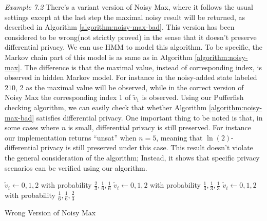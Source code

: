 \noindent
\textit{Example 7.2} There's a variant version of Noisy Max, where it follows the usual settings
except at the last step the maximal
noisy result will be returned, as described in Algorithm \ref{algorithm:noisy-max-bad}.
This version has been considered to be wrong(not strictly proved) in the sense that it doesn't preserve differential privacy.
We can use HMM to model this algorithm.
To be specific, the Markov chain part of this model is as same as in Algorithm \ref{algorithm:noisy-max}.
The difference is that the maximal value, instead of corresponding index, is observed in hidden Markov
model. For instance in the noisy-added state labeled $210$,
$2$ as the maximal value will be observed, while in the correct version of Noisy Max the corresponding index $1$ of $\tilde{v}_1$ is observed.
Using our Pufferfish checking algorithm, we can easily check that whether
Algorithm \ref{algorithm:noisy-max-bad} satisfies differential privacy.
One important thing to be noted is that, in some cases where $n$ is small,
differential privacy is still preserved.
For instance our implementation returns ``unsat'' when $n=5$, meaning that
$\ln(2)$-differential privacy is still preserved under this case.
This result doesn't violate the general consideration of the algorithm;
Instead, it shows that specific privacy scenarios can be verified using our algorithm.

\begin{algorithm}
  \begin{algorithmic}[1]
                {$\tilde{v}_i \leftarrow 0, 1, 2$ with probability
                 $\frac{2}{3}, \frac{1}{6}, \frac{1}{6}$}
                {$\tilde{v}_i \leftarrow 0, 1, 2$ with probability
                 $\frac{1}{3}, \frac{1}{3}, \frac{1}{3}$}
                {$\tilde{v}_i \leftarrow 0, 1, 2$ with probability
                 $\frac{1}{6}, \frac{1}{6}, \frac{2}{3}$}
        \EndMatch
      \EndFor
    \EndFunction
  \end{algorithmic}
  \caption{Wrong Version of Noisy Max}
  \label{algorithm:noisy-max-bad}
\end{algorithm}

